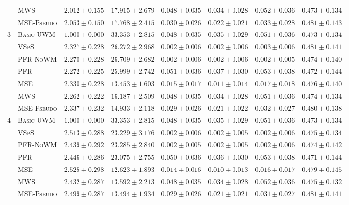 \begin{table}[!htbp]
{\begin{tabular}{llcccccc}
 & \textsc{MWS} & $2.012 \pm 0.155$ & $17.915 \pm 2.679$ & $0.048 \pm 0.035$ & $0.034 \pm 0.028$ & $0.052 \pm 0.036$ & $0.473 \pm 0.134$ \\
 & \textsc{MSE-Pseudo} & $2.053 \pm 0.150$ & $17.768 \pm 2.415$ & $0.030 \pm 0.026$ & $0.022 \pm 0.021$ & $0.033 \pm 0.028$ & $0.481 \pm 0.143$ \\
\midrule
3 & \textsc{Basic-UWM} & $1.000 \pm 0.000$ & $33.353 \pm 2.815$ & $0.048 \pm 0.035$ & $0.035 \pm 0.029$ & $0.051 \pm 0.036$ & $0.473 \pm 0.134$ \\
 & \textsc{VSpS} & $2.327 \pm 0.228$ & $26.272 \pm 2.968$ & $0.002 \pm 0.006$ & $0.002 \pm 0.006$ & $0.003 \pm 0.006$ & $0.481 \pm 0.141$ \\
 & \textsc{PFR-NoWM} & $2.270 \pm 0.228$ & $26.709 \pm 2.682$ & $0.002 \pm 0.006$ & $0.002 \pm 0.006$ & $0.002 \pm 0.005$ & $0.474 \pm 0.140$ \\
 & \textsc{PFR} & $2.272 \pm 0.225$ & $25.999 \pm 2.742$ & $0.051 \pm 0.036$ & $0.037 \pm 0.030$ & $0.053 \pm 0.038$ & $0.472 \pm 0.144$ \\
 & \textsc{MSE} & $2.330 \pm 0.228$ & $13.453 \pm 1.603$ & $0.015 \pm 0.017$ & $0.011 \pm 0.014$ & $0.017 \pm 0.018$ & $0.476 \pm 0.140$ \\
 & \textsc{MWS} & $2.262 \pm 0.222$ & $16.187 \pm 2.509$ & $0.048 \pm 0.035$ & $0.034 \pm 0.028$ & $0.051 \pm 0.036$ & $0.474 \pm 0.134$ \\
 & \textsc{MSE-Pseudo} & $2.337 \pm 0.232$ & $14.933 \pm 2.118$ & $0.029 \pm 0.026$ & $0.021 \pm 0.022$ & $0.032 \pm 0.027$ & $0.480 \pm 0.138$ \\
\midrule
4 & \textsc{Basic-UWM} & $1.000 \pm 0.000$ & $33.353 \pm 2.815$ & $0.048 \pm 0.035$ & $0.035 \pm 0.029$ & $0.051 \pm 0.036$ & $0.473 \pm 0.134$ \\
 & \textsc{VSpS} & $2.513 \pm 0.288$ & $23.229 \pm 3.176$ & $0.002 \pm 0.006$ & $0.002 \pm 0.005$ & $0.002 \pm 0.006$ & $0.475 \pm 0.134$ \\
 & \textsc{PFR-NoWM} & $2.439 \pm 0.292$ & $23.285 \pm 2.840$ & $0.002 \pm 0.005$ & $0.002 \pm 0.005$ & $0.002 \pm 0.006$ & $0.474 \pm 0.142$ \\
 & \textsc{PFR} & $2.446 \pm 0.286$ & $23.075 \pm 2.755$ & $0.050 \pm 0.036$ & $0.036 \pm 0.030$ & $0.053 \pm 0.038$ & $0.471 \pm 0.144$ \\
 & \textsc{MSE} & $2.525 \pm 0.298$ & $12.623 \pm 1.893$ & $0.014 \pm 0.016$ & $0.010 \pm 0.013$ & $0.016 \pm 0.017$ & $0.479 \pm 0.145$ \\
 & \textsc{MWS} & $2.432 \pm 0.287$ & $13.592 \pm 2.213$ & $0.048 \pm 0.035$ & $0.034 \pm 0.028$ & $0.052 \pm 0.036$ & $0.475 \pm 0.132$ \\
 & \textsc{MSE-Pseudo} & $2.499 \pm 0.287$ & $13.494 \pm 1.934$ & $0.029 \pm 0.026$ & $0.021 \pm 0.021$ & $0.031 \pm 0.027$ & $0.481 \pm 0.141$ \\
\bottomrule
\end{tabular}
}
\end{table}

